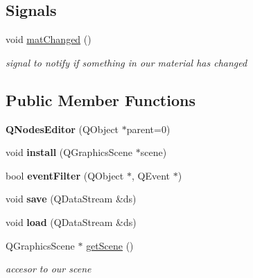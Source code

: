 \subsection*{Signals}
\begin{DoxyCompactItemize}
\item 
\hypertarget{class_q_nodes_editor_a842fbda31eb31c12ac2fe8c9c698c2ab}{void \hyperlink{class_q_nodes_editor_a842fbda31eb31c12ac2fe8c9c698c2ab}{mat\-Changed} ()}\label{class_q_nodes_editor_a842fbda31eb31c12ac2fe8c9c698c2ab}

\begin{DoxyCompactList}\small\item\em signal to notify if something in our material has changed \end{DoxyCompactList}\end{DoxyCompactItemize}
\subsection*{Public Member Functions}
\begin{DoxyCompactItemize}
\item 
\hypertarget{class_q_nodes_editor_a4815f997ee21495e32f5b8b21a864f91}{{\bfseries Q\-Nodes\-Editor} (Q\-Object $\ast$parent=0)}\label{class_q_nodes_editor_a4815f997ee21495e32f5b8b21a864f91}

\item 
\hypertarget{class_q_nodes_editor_affafd1250c98ce1d1585e3077f01c6a4}{void {\bfseries install} (Q\-Graphics\-Scene $\ast$scene)}\label{class_q_nodes_editor_affafd1250c98ce1d1585e3077f01c6a4}

\item 
\hypertarget{class_q_nodes_editor_a6cca4f1abeb3e976532f2d8e845fe9c3}{bool {\bfseries event\-Filter} (Q\-Object $\ast$, Q\-Event $\ast$)}\label{class_q_nodes_editor_a6cca4f1abeb3e976532f2d8e845fe9c3}

\item 
\hypertarget{class_q_nodes_editor_a55ff8aa886bff69e8818c458a1e739a7}{void {\bfseries save} (Q\-Data\-Stream \&ds)}\label{class_q_nodes_editor_a55ff8aa886bff69e8818c458a1e739a7}

\item 
\hypertarget{class_q_nodes_editor_a1b3408929d9a816dfe80dd99b89fee85}{void {\bfseries load} (Q\-Data\-Stream \&ds)}\label{class_q_nodes_editor_a1b3408929d9a816dfe80dd99b89fee85}

\item 
\hypertarget{class_q_nodes_editor_a381b679a27db1a4aeaaa271631c8c699}{Q\-Graphics\-Scene $\ast$ \hyperlink{class_q_nodes_editor_a381b679a27db1a4aeaaa271631c8c699}{get\-Scene} ()}\label{class_q_nodes_editor_a381b679a27db1a4aeaaa271631c8c699}

\begin{DoxyCompactList}\small\item\em accesor to our scene \end{DoxyCompactList}\end{DoxyCompactItemize}
